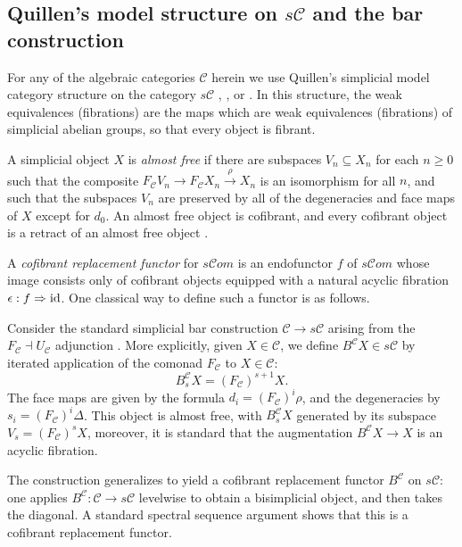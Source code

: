 \documentclass[11pt]{amsart}
\theoremstyle{plain}
\theoremstyle{definition}
\renewcommand{\to}{\longrightarrow}
\newcommand{\scrC}{\mathscr{C}}
\newcommand{\calC}{\mathcal{C}}
\newcommand{\calc}{\mathcal{C}}
\theoremstyle{plain}
\newcommand{\Id}{\textup{id}}
\newcommand{\algcat}{{\scrC\!\textit{om}}}%
\begin{document}
\begin{Conventions and notation}
\subsection{Quillen's model structure on $s\calC$ and the bar construction}\label{ssec: quillen model and bar construction}
For any of the algebraic categories $\calC$ herein we use Quillen's simplicial model category structure on the category $s\calC$ \cite{QuillenHomAlg.pdf}, \cite{MillerSullivanConjecture.pdf}, or \cite{Blanc_Stover-Groth_SS.pdf}. In this structure, the weak equivalences (fibrations) are the maps which are weak equivalences (fibrations) of simplicial abelian groups, so that every object is fibrant. 

 A simplicial object $X$ is \emph{almost free} if there are subspaces $V_n\subseteq X_n$ for each $n\geq0$ such that the composite $F_{\calC} V_n\to F_{\calC} X_n\overset{\rho}{\to} X_n$ is an isomorphism for all $n$, and such that the subspaces $V_n$ are preserved by all of the degeneracies and face maps of $X$ except for $d_0$. An almost free object is cofibrant, and every cofibrant object is a retract of an almost free object \cite[\S3]{MillerSullivanConjecture.pdf}.

A \emph{cofibrant replacement functor} for $s\algcat$  is an endofunctor $f$ of $s\algcat$ whose image consists only of cofibrant objects equipped with  a natural acyclic fibration $\epsilon:f\Rightarrow \Id $. One classical way to define such a functor is as follows.

Consider the standard simplicial bar construction $\calC\to s\calC$ arising from the $F_\calC\dashv U_\calC$ adjunction \cite{BlumRiehlResolutions.pdf}. More explicitly, given $X\in\calC$, we define $B^\calC X\in s\calC$ by iterated application of the comonad $F_\calC$ to $X\in \calC$:
\[B_s^\calC X=(F_\calC)^{s+1}X.\]
The face maps are given by the formula $d_i=(F_\calC)^i\rho$, and the degeneracies by $s_i=(F_\calC)^i\Delta$. %
This object is almost free, with $B_s^\calC X$ generated by its subspace $V_s=(F_{\calC})^sX$, moreover, it is standard \cite[\S4]{BlumRiehlResolutions.pdf} that the augmentation $B^\calC X\to X$ is an acyclic fibration.

The construction generalizes to yield a cofibrant replacement functor $B^{\calc}$ on $s\calc$: one applies  $B^{\calc}:\calc\to s\calc$ levelwise to obtain a bisimplicial object, and then takes the diagonal. A standard spectral sequence argument shows that this is a cofibrant replacement functor.


\end{Conventions and notation}
\end{document}
